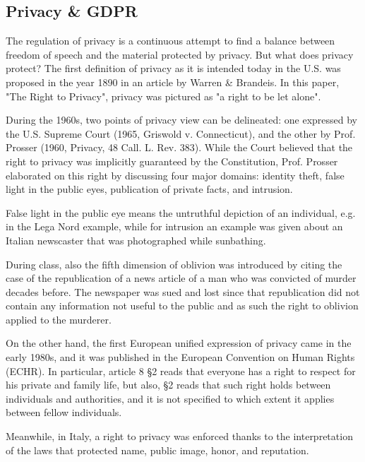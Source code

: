 
\subsection*{Privacy \& GDPR}

The regulation of privacy is a continuous attempt to find a balance between freedom of speech and the material protected by privacy. But what does privacy protect? 
The first definition of privacy as it is intended today in the U.S. was proposed in the year 1890 in an article by Warren \& Brandeis. In this paper, "The Right to Privacy", privacy was pictured as "a right to be let alone". 

During the 1960s, two points of privacy view can be delineated: one expressed by the U.S. Supreme Court (1965, Griswold v. Connecticut), and the other by Prof. Prosser (1960, Privacy, 48 Call. L. Rev. 383). While the Court believed that the right to privacy was implicitly guaranteed by the Constitution, Prof. Prosser elaborated on this right by discussing four major domains: identity theft, false light in the public eyes, publication of private facts, and intrusion.

False light in the public eye means the untruthful depiction of an individual, e.g. in the Lega Nord example, while for intrusion an example was given about an Italian newscaster that was photographed while sunbathing.

During class, also the fifth dimension of oblivion was introduced by citing the case of the republication of a news article of a man who was convicted of murder decades before. The newspaper was sued and lost since that republication did not contain any information not useful to the public and as such the right to oblivion applied to the murderer.

On the other hand, the first European unified expression of privacy came in the early 1980s, and it was published in the European Convention on Human Rights (ECHR). 
In particular, article 8 \S 2 reads that everyone has a right to respect for his private and family life, but also, \S 2 reads that such right holds between individuals and authorities, and it is not specified to which extent it applies between fellow individuals.

Meanwhile, in Italy, a right to privacy was enforced thanks to the interpretation of the laws that protected name, public image, honor, and reputation.

